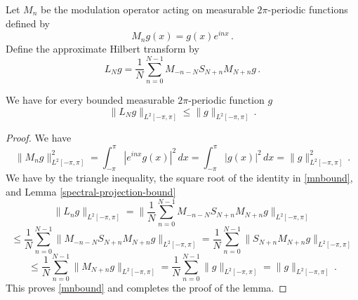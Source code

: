 {Let $M_n$ be the modulation operator
acting on measurable $2\pi$-periodic functions
defined by
\begin{equation}
    M_ng(x)=g(x) e^{inx}\, .
\end{equation}
Define the approximate Hilbert transform by
\begin{equation}
    L_N g=\frac 1N\sum_{n=0}^{N-1}
       M_{-n-N} S_{N+n}M_{N+n}g\, .
\end{equation}


\begin{lemma}
\label{lem-ln-bound}
We have for every bounded measurable $2\pi$-periodic function $g$
\begin{equation}\label{lnbound}
    \|L_Ng\|_{L^2[-\pi, \pi]}\le \|g\|_{L^2[-\pi, \pi]}\,.
\end{equation}
\end{lemma}
\begin{proof}
    We have
    \begin{equation}\label{mnbound}
        \|M_ng\|_{L^2[-\pi, \pi]}^2=\int_{-\pi}^{\pi} |e^{inx}g(x)|^2\, dx
        =\int_{-\pi}^{\pi} |g(x)|^2\, dx=\|g\|_{L^2[-\pi, \pi]}^2\, .
    \end{equation}
     We have by the triangle inequality, the square root of the identity in \eqref{mnbound}, and Lemma \ref{spectral-projection-bound}
    \begin{equation*}
        \|L_ng\|_{L^2[-\pi, \pi]}=\|\frac 1N\sum_{n=0}^{N-1}
       M_{-n-N} S_{N+n}M_{N+n}g\|_{L^2[-\pi, \pi]}
    \end{equation*}
    \begin{equation*}
        \le \frac 1N\sum_{n=0}^{N-1} \|
       M_{-n-N} S_{N+n}M_{N+n}g\|_{L^2[-\pi, \pi]}
         = \frac 1N\sum_{n=0}^{N-1} \|
    S_{N+n}M_{N+n}g\|_{L^2[-\pi, \pi]}
    \end{equation*}
       \begin{equation}
     \le \frac 1N\sum_{n=0}^{N-1} \|
 M_{N+n}g\|_{L^2[-\pi, \pi]}  = \frac 1N\sum_{n=0}^{N-1} \|
g\|_{L^2[-\pi, \pi]} =\|g\|_{L^2[-\pi, \pi]}\, .
    \end{equation}
This proves \eqref{mnbound} and completes the proof of the lemma.
\end{proof}

}
